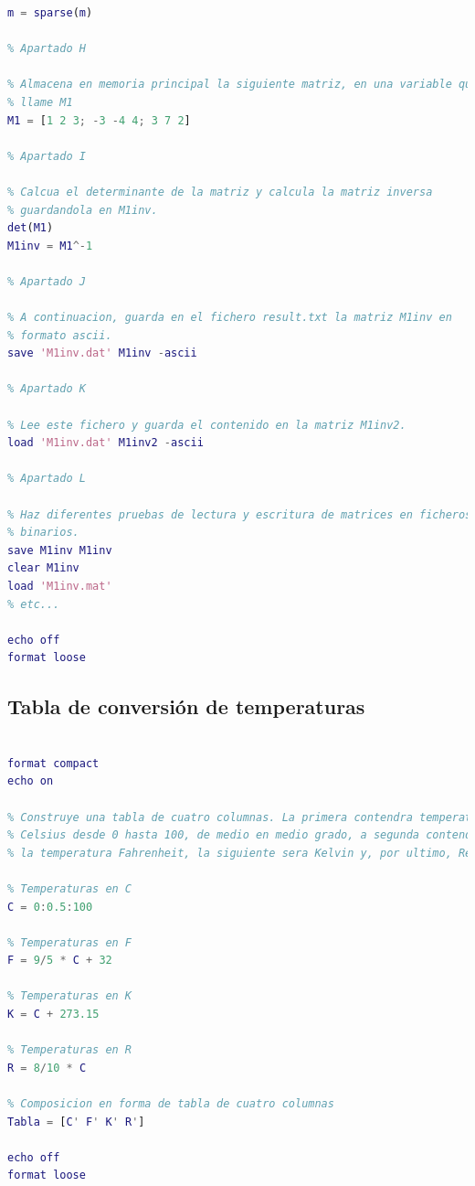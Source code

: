 \begin{lstlisting}[language=Matlab]
% Convierte esta matriz en una matriz dispersa.
m = sparse(m)

% Apartado H

% Almacena en memoria principal la siguiente matriz, en una variable que se
% llame M1
M1 = [1 2 3; -3 -4 4; 3 7 2]

% Apartado I

% Calcua el determinante de la matriz y calcula la matriz inversa
% guardandola en M1inv.
det(M1)
M1inv = M1^-1

% Apartado J

% A continuacion, guarda en el fichero result.txt la matriz M1inv en
% formato ascii.
save 'M1inv.dat' M1inv -ascii

% Apartado K

% Lee este fichero y guarda el contenido en la matriz M1inv2.
load 'M1inv.dat' M1inv2 -ascii

% Apartado L

% Haz diferentes pruebas de lectura y escritura de matrices en ficheros
% binarios.
save M1inv M1inv
clear M1inv
load 'M1inv.mat'
% etc...

echo off
format loose
\end{lstlisting}


\subsection{Tabla de conversión de temperaturas}
\begin{lstlisting}[language=Matlab]
% Ejercicio 8. Tabla de conversion de temperaturas

format compact
echo on

% Construye una tabla de cuatro columnas. La primera contendra temperaturas
% Celsius desde 0 hasta 100, de medio en medio grado, a segunda contendra
% la temperatura Fahrenheit, la siguiente sera Kelvin y, por ultimo, Reamur.

% Temperaturas en C
C = 0:0.5:100

% Temperaturas en F
F = 9/5 * C + 32

% Temperaturas en K
K = C + 273.15

% Temperaturas en R
R = 8/10 * C

% Composicion en forma de tabla de cuatro columnas
Tabla = [C' F' K' R']

echo off
format loose
\end{lstlisting}



